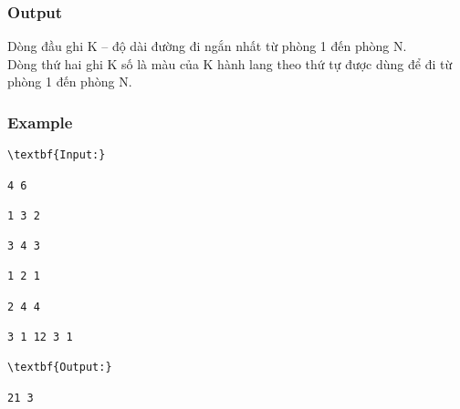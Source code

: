 \subsubsection{   Output  }

   Dòng đầu ghi K – độ dài đường đi ngắn nhất từ phòng 1 đến phòng N.   
\\   Dòng thứ hai ghi K số là màu của K hành lang theo thứ tự được dùng để đi từ phòng 1 đến phòng N.  

\subsubsection{   Example  }
\begin{verbatim}
\textbf{Input:}

4 6

1 3 2

3 4 3

1 2 1

2 4 4

3 1 12 3 1 

\textbf{Output:}

21 3\end{verbatim}
